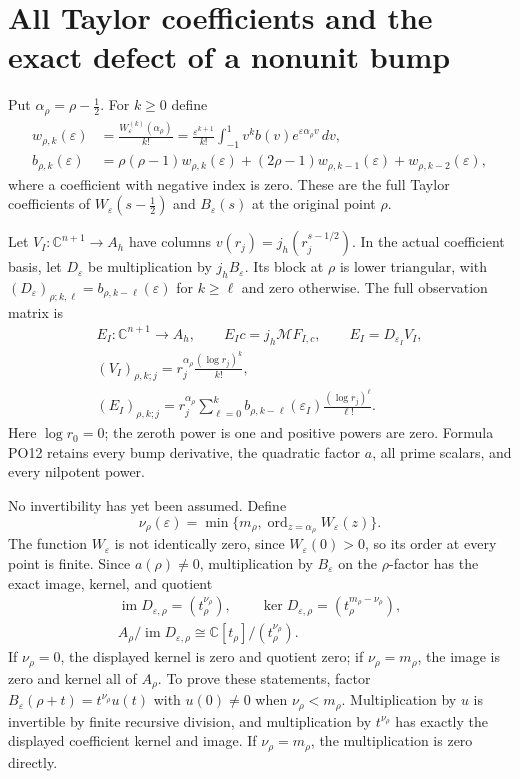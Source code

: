 \documentclass[11pt]{article}
\newcommand{\C}{\mathbb C}
\newcommand{\M}{\mathcal M}
\newcommand{\eps}{\varepsilon}
\newcommand{\im}{\operatorname{im}}
\begin{document}
\section{All Taylor coefficients and the exact defect of a nonunit bump}

Put \(\alpha_\rho=\rho-\tfrac12\). For \(k\ge0\) define
\[
 \begin{aligned}
 w_{\rho,k}(\eps)
   &=\frac{W_\eps^{(k)}(\alpha_\rho)}{k!}
     =\frac{\eps^{k+1}}{k!}
        \int_{-1}^1v^k b(v)e^{\eps\alpha_\rho v}\,dv,\\
 b_{\rho,k}(\eps)
   &=\rho(\rho-1)w_{\rho,k}(\eps)
       +(2\rho-1)w_{\rho,k-1}(\eps)+w_{\rho,k-2}(\eps),
 \end{aligned}
 \tag{PO11}\label{po:taylor}
\]
where a coefficient with negative index is zero. These are the
full Taylor coefficients of \(W_\eps(s-\tfrac12)\) and
\(B_\eps(s)\) at the original point \(\rho\).

Let \(V_I:\C^{n+1}\to A_h\) have columns
\(v(r_j)=j_h(r_j^{s-1/2})\). In the actual coefficient basis,
let \(D_\eps\) be multiplication by \(j_hB_\eps\).
Its block at \(\rho\) is lower triangular, with
\((D_\eps)_{\rho;k,\ell}=b_{\rho,k-\ell}(\eps)\) for \(k\ge\ell\)
and zero otherwise. The full observation matrix is
\[
 \begin{gathered}
 E_I:\C^{n+1}\longrightarrow A_h,\qquad
 E_Ic=j_h\M F_{I,c},\qquad E_I=D_{\eps_I}V_I,\\
 (V_I)_{\rho,k;j}
       =r_j^{\alpha_\rho}\frac{(\log r_j)^k}{k!},\\
 (E_I)_{\rho,k;j}
       =r_j^{\alpha_\rho}\sum_{\ell=0}^k
           b_{\rho,k-\ell}(\eps_I)\frac{(\log r_j)^\ell}{\ell!}.
 \end{gathered}
 \tag{PO12}\label{po:matrix}
\]
Here \(\log r_0=0\); the zeroth power is one and positive powers
are zero. Formula PO12 retains every bump derivative, the quadratic
factor \(a\), all prime scalars, and every nilpotent power.

No invertibility has yet been assumed. Define
\[
 \nu_\rho(\eps)=
    \min\{m_\rho,\operatorname{ord}_{z=\alpha_\rho}W_\eps(z)\}.
 \tag{PO13}\label{po:vanishing}
\]
The function \(W_\eps\) is not identically zero, since
\(W_\eps(0)>0\), so its order at every point is finite.
Since \(a(\rho)\ne0\), multiplication by \(B_\eps\) on the
\(\rho\)-factor has the exact image, kernel, and quotient
\[
 \begin{gathered}
 \im D_{\eps,\rho}=(t_\rho^{\nu_\rho}),\qquad
 \ker D_{\eps,\rho}=(t_\rho^{m_\rho-\nu_\rho}),\\
 A_\rho/\im D_{\eps,\rho}\cong\C[t_\rho]/(t_\rho^{\nu_\rho}).
 \end{gathered}
 \tag{PO14}\label{po:nonunit}
\]
If \(\nu_\rho=0\), the displayed kernel is zero and quotient
zero; if \(\nu_\rho=m_\rho\), the image is zero and kernel all
of \(A_\rho\). To prove these statements, factor
\(B_\eps(\rho+t)=t^{\nu_\rho}u(t)\) with \(u(0)\ne0\)
when \(\nu_\rho<m_\rho\). Multiplication by \(u\) is invertible
by finite recursive division, and multiplication by \(t^{\nu_\rho}\)
has exactly the displayed coefficient kernel and image.
If \(\nu_\rho=m_\rho\), the multiplication is zero directly.
\end{document}
